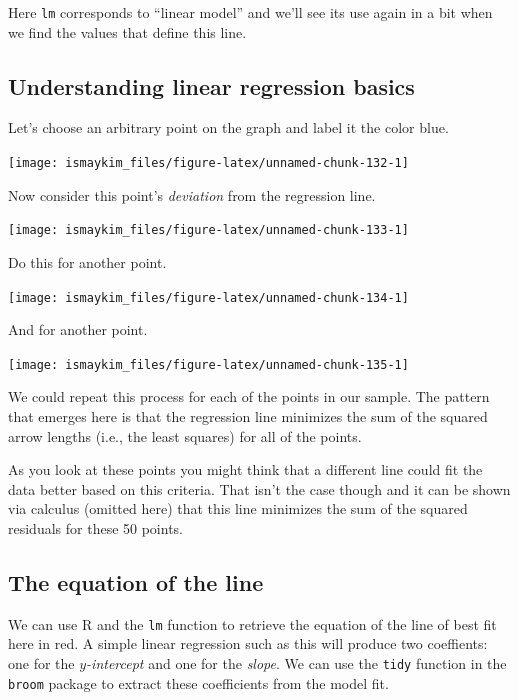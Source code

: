 \documentclass[]{tufte-book}
\begin{document}
Here \texttt{lm} corresponds to ``linear model'' and we'll see its use
again in a bit when we find the values that define this line.

\subsection{Understanding linear regression
basics}\label{understanding-linear-regression-basics}

Let's choose an arbitrary point on the graph and label it the color
blue.

\begin{center}\texttt{[image: ismaykim\_files/figure-latex/unnamed-chunk-132-1]} \end{center}

Now consider this point's \emph{deviation} from the regression line.

\begin{center}\texttt{[image: ismaykim\_files/figure-latex/unnamed-chunk-133-1]} \end{center}

Do this for another point.

\begin{center}\texttt{[image: ismaykim\_files/figure-latex/unnamed-chunk-134-1]} \end{center}

And for another point.

\begin{center}\texttt{[image: ismaykim\_files/figure-latex/unnamed-chunk-135-1]} \end{center}

We could repeat this process for each of the points in our sample. The
pattern that emerges here is that the regression line minimizes the sum
of the squared arrow lengths (i.e., the least squares) for all of the
points.

As you look at these points you might think that a different line could
fit the data better based on this criteria. That isn't the case though
and it can be shown via calculus (omitted here) that this line minimizes
the sum of the squared residuals for these 50 points.

\subsection{The equation of the line}\label{the-equation-of-the-line}

We can use R and the \texttt{lm} function to retrieve the equation of
the line of best fit here in red. A simple linear regression such as
this will produce two coeffients: one for the \emph{\(y\)-intercept} and
one for the \emph{slope}. We can use the \texttt{tidy} function in the
\texttt{broom} package to extract these coefficients from the model fit.
\end{document}
